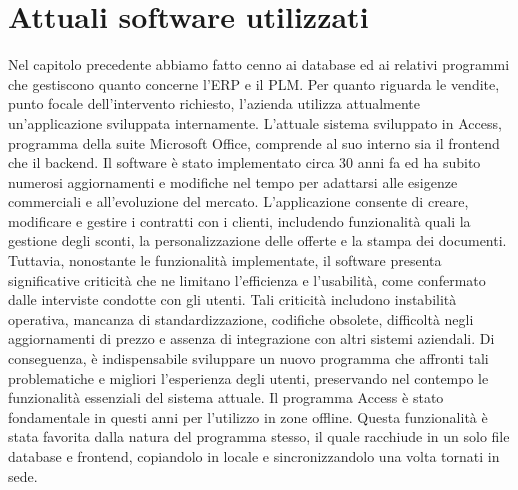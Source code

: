 \section{Attuali software utilizzati}
Nel capitolo precedente abbiamo fatto cenno ai database ed ai relativi programmi che gestiscono quanto concerne l'\ac{ERP}
e il \ac{PLM}.
Per quanto riguarda le vendite, punto focale dell'intervento richiesto, l'azienda utilizza attualmente
un'applicazione sviluppata internamente. L'attuale sistema sviluppato in Access, programma della suite Microsoft Office,
comprende al suo interno sia il frontend che il backend.
Il software è stato implementato circa 30 anni fa ed ha subito numerosi aggiornamenti e
modifiche nel tempo per adattarsi alle esigenze commerciali e all'evoluzione del
mercato. L'applicazione consente di creare, modificare e gestire i contratti con i
clienti, includendo funzionalità quali la gestione degli sconti, la personalizzazione
delle offerte e la stampa dei documenti. Tuttavia, nonostante le funzionalità implementate,
il software presenta significative criticità che ne limitano l'efficienza e
l'usabilità, come confermato dalle interviste condotte con gli utenti. Tali criticità
includono instabilità operativa, mancanza di standardizzazione, codifiche obsolete,
difficoltà negli aggiornamenti di prezzo e assenza di integrazione con altri sistemi
aziendali. Di conseguenza, è indispensabile sviluppare un nuovo programma
che affronti tali problematiche e migliori l'esperienza degli utenti,
preservando nel contempo le funzionalità essenziali del sistema attuale.
Il programma Access è stato fondamentale in questi anni per l'utilizzo in zone offline.
Questa funzionalità è stata favorita dalla natura del programma stesso,
il quale racchiude in un solo file database e frontend,
copiandolo in locale e sincronizzandolo una volta tornati in sede.

